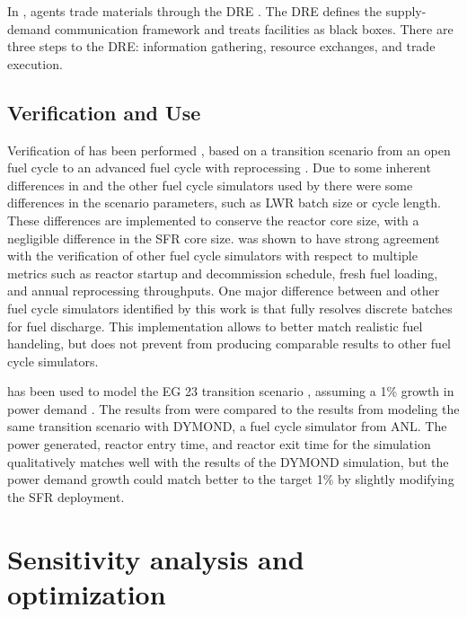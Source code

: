 In \Cyclus, agents trade materials through the \gls{DRE} 
\cite{gidden_agent-based_2015,huff_fundamental_2016}. The \gls{DRE} defines the 
supply-demand communication framework and treats facilities as black boxes. 
There are three steps to the \gls{DRE}: information gathering, resource 
exchanges, and trade execution. 

\subsection{Verification and Use}
Verification of \Cyclus has been performed \cite{bae_standardized_2019}, 
based on a transition scenario from an open fuel cycle to an advanced
fuel cycle with reprocessing \cite{feng_standardized_2016}. Due to 
some inherent differences in \Cyclus and the other fuel cycle simulators 
used by \cite{feng_standardized_2016} there were some differences in 
the scenario parameters, such as \gls{LWR} batch size or 
cycle length. These differences are implemented to conserve the reactor 
core size, with a negligible difference in the \gls{SFR} core size. \Cyclus 
was shown to have strong agreement with the verification of other 
fuel cycle simulators \cite{bae_standardized_2019} with respect to 
multiple metrics such as reactor startup and decommission schedule, fresh 
fuel loading, and annual reprocessing throughputs. One major difference
between \Cyclus and other fuel cycle simulators identified by this work 
is that \Cyclus fully resolves discrete batches for fuel discharge. This 
implementation allows \Cyclus to better match realistic fuel handeling, but 
does not prevent \Cyclus from producing comparable results to other 
fuel cycle simulators. 

\Cyclus has been used to model the EG 23 transition scenario 
\cite{wigeland_nuclear_2014}, assuming a 1\% growth in power demand 
\cite{djokic_application_2015}. The results from \Cyclus were compared 
to the results from modeling the same transition scenario with DYMOND, 
a fuel cycle simulator from \gls{ANL}. The power generated, reactor entry 
time, and reactor exit time for the \Cyclus simulation qualitatively 
matches well with the results of the DYMOND simulation, but the power 
demand growth could match better to the target 1\% by slightly modifying 
the \gls{SFR} deployment. 

\section{Sensitivity analysis and optimization}

